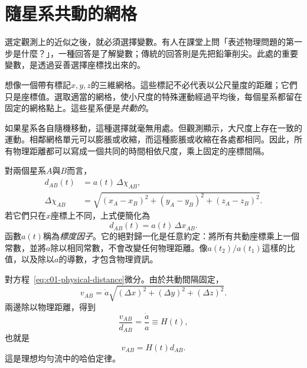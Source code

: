 \begin{classroomqa}
\end{classroomqa}

\section{隨星系共動的網格}

選定觀測上的近似之後，就必須選擇變數。有人在課堂上問「表述物理問題的第一步是什麼？」，一種回答是了解變數；傳統的回答則是先把鉛筆削尖。此處的重要變數，是透過妥善選擇座標找出來的。

想像一個帶有標記\(x,y,z\)的三維網格。這些標記不必代表以公尺量度的距離；它們只是座標值。選取適當的網格，使小尺度的特殊運動經過平均後，每個星系都留在固定的網格點上。這些星系便是\emph{共動的}。

如果星系各自隨機移動，這種選擇就毫無用處。但觀測顯示，大尺度上存在一致的運動。相鄰網格單元可以膨脹或收縮，而這種膨脹或收縮在各處都相同。因此，所有物理距離都可以寫成一個共同的時間相依尺度，乘上固定的座標間隔。

對兩個星系\(A\)與\(B\)而言，
\begin{equation}
\begin{aligned}
d_{AB}(t)&=a(t)\,\Delta\chi_{AB},\\
\Delta\chi_{AB}
&=\sqrt{(x_A-x_B)^2+(y_A-y_B)^2+(z_A-z_B)^2}.
\end{aligned}
\label{eq:c01-physical-distance}
\end{equation}
若它們只在\(x\)座標上不同，上式便簡化為
\begin{equation}
d_{AB}(t)=a(t)\,\Delta x_{AB}.
\end{equation}
函數\(a(t)\)稱為\emph{標度因子}。它的絕對歸一化是任意約定：將所有共動座標乘上一個常數，並將\(a\)除以相同常數，不會改變任何物理距離。像\(a(t_2)/a(t_1)\)這樣的比值，以及除以\(a\)的導數，才包含物理資訊。

對方程~\eqref{eq:c01-physical-distance}微分。由於共動間隔固定，
\begin{equation}
v_{AB}=\dot a\sqrt{(\Delta x)^2+(\Delta y)^2+(\Delta z)^2}.
\end{equation}
兩邊除以物理距離，得到
\begin{equation}
\frac{v_{AB}}{d_{AB}}=\frac{\dot a}{a}\equiv H(t),
\label{eq:c01-hubble-parameter}
\end{equation}
也就是
\begin{equation}
\boxed{v_{AB}=H(t)d_{AB}.}
\label{eq:c01-hubble-law}
\end{equation}
這是理想均勻流中的哈伯定律。

